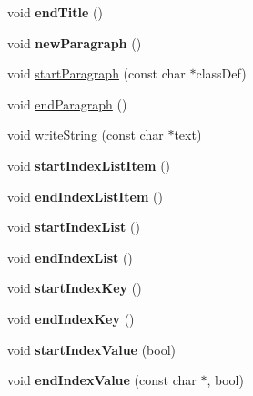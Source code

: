 \begin{DoxyCompactItemize}
void {\bfseries end\+Title} ()
\item 
\mbox{\label{class_latex_generator_a6c246c6a7fc6f612388e13eb89ff0b63}} 
void {\bfseries new\+Paragraph} ()
\item 
void \mbox{\hyperlink{class_latex_generator_a467ae3fdba818b4efaefb168455c4796}{start\+Paragraph}} (const char $\ast$class\+Def)
\item 
void \mbox{\hyperlink{class_latex_generator_a725c87d183be3801d4ceecb793ecb458}{end\+Paragraph}} ()
\item 
void \mbox{\hyperlink{class_latex_generator_a03cd5be16357940ab7d712791fc8949e}{write\+String}} (const char $\ast$text)
\item 
\mbox{\label{class_latex_generator_a5a1c59d49dcb899c53adb5958e31cd4d}} 
void {\bfseries start\+Index\+List\+Item} ()
\item 
\mbox{\label{class_latex_generator_aab6f467db6d8d3cdb5d3e07e085eb640}} 
void {\bfseries end\+Index\+List\+Item} ()
\item 
\mbox{\label{class_latex_generator_a322f5fe4d3e171b290a04ba48f3d6bdd}} 
void {\bfseries start\+Index\+List} ()
\item 
\mbox{\label{class_latex_generator_aa4fdc9d768a181ac189572077cc824ed}} 
void {\bfseries end\+Index\+List} ()
\item 
\mbox{\label{class_latex_generator_a770f8b7576f164f5fe756aa5d08dabb8}} 
void {\bfseries start\+Index\+Key} ()
\item 
\mbox{\label{class_latex_generator_ad9348eb54c1c58051655ecd83f2dd84d}} 
void {\bfseries end\+Index\+Key} ()
\item 
\mbox{\label{class_latex_generator_ac6e9c546b62660982e877f448e30b2a1}} 
void {\bfseries start\+Index\+Value} (bool)
\item 
\mbox{\label{class_latex_generator_a3acbbf4994f9f80a676192ec476e0b5a}} 
void {\bfseries end\+Index\+Value} (const char $\ast$, bool)
\item 

\end{DoxyCompactItemize}
